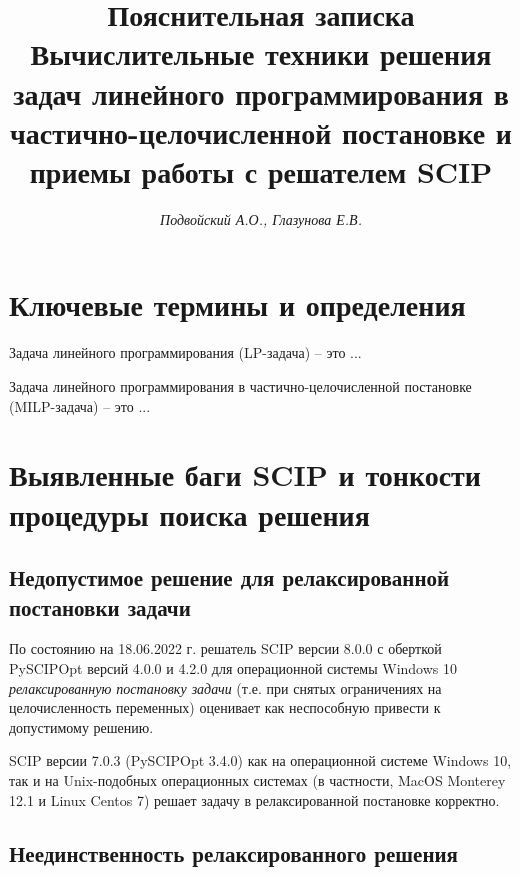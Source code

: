 \documentclass[%
	11pt,
	a4paper,
	utf8,
		]{article}
\begin{document}
\title{Пояснительная записка\\{\large Вычислительные техники решения задач линейного программирования в частично-целочисленной постановке и приемы работы с решателем SCIP}}

\author{\itshape Подвойский А.О., Глазунова Е.В.}


\date{}
\maketitle

\thispagestyle{fancy}



\tableofcontents

\section{Ключевые термины и определения}

{Задача линейного программирования} (LP-задача) -- это ...

{Задача линейного программирования в частично-целочисленной постановке} (MILP-задача) -- это ...

\section{Выявленные баги SCIP и тонкости процедуры поиска решения}

\subsection{Недопустимое решение для релаксированной постановки задачи}

По состоянию на 18.06.2022 г. решатель SCIP версии 8.0.0 с оберткой PySCIPOpt версий 4.0.0 и 4.2.0 для операционной системы Windows 10 \emph{релаксированную постановку задачи} (т.е. при снятых ограничениях на целочисленность переменных) оценивает как неспособную привести к допустимому решению.

SCIP версии 7.0.3 (PySCIPOpt 3.4.0) как на операционной системе Windows 10, так и на Unix-подобных операционных системах (в частности, MacOS Monterey 12.1 и Linux Centos 7) решает задачу в релаксированной постановке корректно.

\subsection{Неединственность релаксированного решения}
\end{document}
